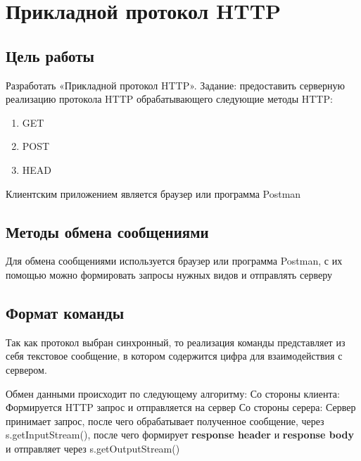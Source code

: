 \documentclass[a4paper,12pt]{extarticle}
\begin{document}
\section{Прикладной протокол HTTP}
\subsection{Цель работы}
Разработать «Прикладной протокол HTTP».
Задание: предоставить серверную реализацию протокола HTTP обрабатывающего следующие методы HTTP:
\begin{enumerate}
\item GET
\item POST
\item HEAD
\end{enumerate}
Клиентским приложением является браузер или программа Postman

\subsection{Методы обмена сообщениями}
Для обмена сообщениями используется браузер или программа Postman, с их помощью можно формировать запросы нужных видов и отправлять серверу
\subsection{Формат команды}
Так как протокол выбран синхронный, то реализация команды представляет из себя текстовое сообщение, в котором содержится цифра для взаимодействия с сервером.

Обмен данными происходит по следующему алгоритму:
\newline
Со стороны клиента:
Формируется HTTP запрос и отправляется на сервер
Со стороны серера:
Сервер принимает запрос, после чего обрабатывает полученное сообщение, через s.getInputStream(), после чего формирует \textbf{response header} и \textbf{response body}
и отправляет через s.getOutputStream()
\end{document}
